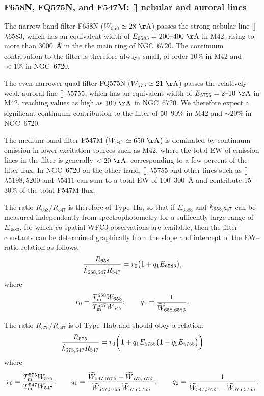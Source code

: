 \documentclass[preprint, 12pt]{aastex}
\newcommand\nii{[\ion{N}{2}]}
\newcommand\Wav[1]{\ensuremath{\lambda #1}}
\begin{document}
\subsubsection{F658N, FQ575N, and F547M: \nii{} nebular and auroral lines}
\label{sec:658-575-547}

The narrow-band filter F658N (\(W_{658} \simeq 28~\U{\AA}\)) passes
the strong nebular line \nii{} \Wav{6583}, which has an equivalent
width of \(E_{6583} = 200\textrm{--}400~\U{\AA}\) in M42, rising to
more than 3000~\U{\AA} in the the main ring of NGC~6720.
The continuum contribution to the filter is therefore always small, of
order 10\% in M42 and \(< 1\%\) in NGC~6720.

The even narrower quad filter FQ575N (\(W_{575} \simeq 21~\U{\AA}\))
passes the relatively weak auroral line \nii{} \Wav{5755}, which has
an equivalent width of \(E_{5755} = 2\textrm{--}10~\U{\AA}\) in M42,
reaching values as high as \(100~\U{\AA}\) in NGC~6720.  We therefore
expect a significant continuum contribution to the filter of 50--90\%
in M42 and \(\sim 20\%\) in NGC~6720.

The medium-band filter F547M (\(W_{547} \simeq 650~\U{\AA}\)) is
dominated by continuum emission in lower excitation sources such as
M42, where the total EW of emission lines in the filter is generally
\(< 20~\U{\AA}\), corresponding to a few percent of the filter flux.
In NGC~6720 on the other hand, \nii{} \Wav{5755} and other lines such
as [] \Wav{5198,5200} and  \Wav{5411} can sum to
a total EW of 100--300~\AA{} and contribute 15--30\% of the total
F547M flux.

The ratio \(R_{658} / R_{547}\) is therefore of Type~IIa, so that if
\(E_{6583}\) and \(\widetilde{k}_{658, 547}\) can be measured independently
from spectrophotometry for a sufficently large range of \(E_{6583}\),
for which co-spatial WFC3 observations are available, then the filter constants can be determined graphically from the slope and
intercept of the EW--ratio relation as follows:
\begin{equation}
  \label{eq:658-547}
  \frac{R_{658}}{\widetilde{k}_{658, 547} R_{547}} = 
  r_0 \bigl( 
  1 + q_1 E_{6583}  
  \bigr) , 
\end{equation}
where
\[
r_0 = \frac{T_{\mathrm{m}}^{658} W_{658}}{T_{\mathrm{m}}^{547} W_{547}} ;
\quad\quad
q_1 = \frac{1}{\widetilde{W}_{658, 6583}} .
\]

The ratio \(R_{575} / R_{547}\) is of Type~IIab and should obey a relation:
\begin{equation}
  \label{eq:575-547}
  \frac{R_{575}}{\widetilde{k}_{575, 547} R_{547}} = 
  r_0 \biggl( 
    1 + q_1 E_{5755} \bigl( 
      1 - q_2 E_{5755}
    \bigr)
  \biggr)
\end{equation}
where
\[
r_0 = \frac{T_{\mathrm{m}}^{575} W_{575}}{T_{\mathrm{m}}^{547} W_{547}} ;
\quad\quad
q_1 = \frac{\widetilde{W}_{547, 5755} - \widetilde{W}_{575, 5755}}{\widetilde{W}_{547, 5755} \, \widetilde{W}_{575, 5755}} ;
\quad\quad
q_2 = \frac{1}{\widetilde{W}_{547, 5755} - \widetilde{W}_{575, 5755}} .
\]
\end{document}
